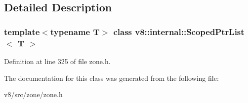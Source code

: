 \subsection{Detailed Description}
\subsubsection*{template$<$typename T$>$\newline
class v8\+::internal\+::\+Scoped\+Ptr\+List$<$ T $>$}



Definition at line 325 of file zone.\+h.



The documentation for this class was generated from the following file\+:\begin{DoxyCompactItemize}
\item 
v8/src/zone/zone.\+h\end{DoxyCompactItemize}
